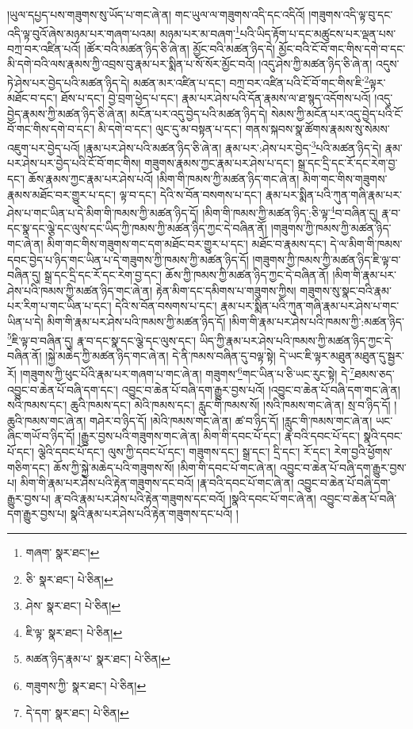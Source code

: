 །ཡུལ་དཔྱད་པས་གཟུགས་སུ་ཡོད་པ་གང་ཞེ་ན། གང་ཡུལ་ལ་གཟུགས་འདི་དང་འདིའོ། །གཟུགས་འདི་ལྟ་བུ་དང་འདི་ལྟ་བུའོ་ཞེས་མཉམ་པར་གཞག་པའམ། མཉམ་པར་མ་བཞག་\footnote{གཞག་  སྣར་ཐང་། }པའི་ཡིད་རྟོག་པ་དང་མཚུངས་པར་ལྡན་པས་བཀྲ་བར་འཛིན་པའོ། །ཚོར་བའི་མཚན་ཉིད་ཅི་ཞེ་ན། མྱོང་བའི་མཚན་ཉིད་དེ། མྱོང་བའི་ངོ་བོ་གང་གིས་དགེ་བ་དང་མི་དགེ་བའི་ལས་རྣམས་ཀྱི་འབྲས་བུ་རྣམ་པར་སྨིན་པ་སོ་སོར་མྱོང་བའོ། །འདུ་ཤེས་ཀྱི་མཚན་ཉིད་ཅི་ཞེ་ན། འདུས་ཏེ་ཤེས་པར་བྱེད་པའི་མཚན་ཉིད་དེ། མཚན་མར་འཛིན་པ་དང་། བཀྲ་བར་འཛིན་པའི་ངོ་བོ་གང་གིས་ཇི་\footnote{ཅི་  སྣར་ཐང་།  པེ་ཅིན། }ལྟར་མཐོང་བ་དང་། ཐོས་པ་དང་། བྱེ་བྲག་ཕྱེད་པ་དང་། རྣམ་པར་ཤེས་པའི་དོན་རྣམས་ལ་ཐ་སྙད་འདོགས་པའོ། །འདུ་བྱེད་རྣམས་ཀྱི་མཚན་ཉིད་ཅི་ཞེ་ན། མངོན་པར་འདུ་བྱེད་པའི་མཚན་ཉིད་དེ། སེམས་ཀྱི་མངོན་པར་འདུ་བྱེད་པའི་ངོ་བོ་གང་གིས་དགེ་བ་དང་། མི་དགེ་བ་དང་། ལུང་དུ་མ་བསྟན་པ་དང་། གནས་སྐབས་སྣ་ཚོགས་རྣམས་སུ་སེམས་འཇུག་པར་བྱེད་པའོ། །རྣམ་པར་ཤེས་པའི་མཚན་ཉིད་ཅི་ཞེ་ན། རྣམ་པར་:ཤེས་པར་བྱེད་\footnote{ཤེས་  སྣར་ཐང་།  པེ་ཅིན། }པའི་མཚན་ཉིད་དེ། རྣམ་པར་ཤེས་པར་བྱེད་པའི་ངོ་བོ་གང་གིས། གཟུགས་རྣམས་ཀྱང་རྣམ་པར་ཤེས་པ་དང་། སྒྲ་དང་དྲི་དང་རོ་དང་རེག་བྱ་དང་། ཆོས་རྣམས་ཀྱང་རྣམ་པར་ཤེས་པའོ། །མིག་གི་ཁམས་ཀྱི་མཚན་ཉིད་གང་ཞེ་ན། མིག་གང་གིས་གཟུགས་རྣམས་མཐོང་བར་གྱུར་པ་དང་། ལྟ་བ་དང་། དེའི་ས་བོན་བསགས་པ་དང་། རྣམ་པར་སྨིན་པའི་ཀུན་གཞི་རྣམ་པར་ཤེས་པ་གང་ཡིན་པ་དེ་མིག་གི་ཁམས་ཀྱི་མཚན་ཉིད་དོ། །མིག་གི་ཁམས་ཀྱི་མཚན་ཉིད་:ཅི་ལྟ་\footnote{ཇི་ལྟ་  སྣར་ཐང་།  པེ་ཅིན། }བ་བཞིན་དུ། རྣ་བ་དང་སྣ་དང་ལྕེ་དང་ལུས་དང་ཡིད་ཀྱི་ཁམས་ཀྱི་མཚན་ཉིད་ཀྱང་དེ་བཞིན་ནོ། །གཟུགས་ཀྱི་ཁམས་ཀྱི་མཚན་ཉིད་གང་ཞེ་ན། མིག་གང་གིས་གཟུགས་གང་དག་མཐོང་བར་གྱུར་པ་དང་། མཐོང་བ་རྣམས་དང་། དེ་ལ་མིག་གི་ཁམས་དབང་བྱེད་པ་ཉིད་གང་ཡིན་པ་དེ་གཟུགས་ཀྱི་ཁམས་ཀྱི་མཚན་ཉིད་དོ། །གཟུགས་ཀྱི་ཁམས་ཀྱི་མཚན་ཉིད་ཇི་ལྟ་བ་བཞིན་དུ། སྒྲ་དང་དྲི་དང་རོ་དང་རེག་བྱ་དང་། ཆོས་ཀྱི་ཁམས་ཀྱི་མཚན་ཉིད་ཀྱང་དེ་བཞིན་ནོ། །མིག་གི་རྣམ་པར་ཤེས་པའི་ཁམས་ཀྱི་མཚན་ཉིད་གང་ཞེ་ན། རྟེན་མིག་དང་དམིགས་པ་གཟུགས་ཀྱིས། གཟུགས་སུ་སྣང་བའི་རྣམ་པར་རིག་པ་གང་ཡིན་པ་དང་། དེའི་ས་བོན་བསགས་པ་དང་། རྣམ་པར་སྨིན་པའི་ཀུན་གཞི་རྣམ་པར་ཤེས་པ་གང་ཡིན་པ་དེ། མིག་གི་རྣམ་པར་ཤེས་པའི་ཁམས་ཀྱི་མཚན་ཉིད་དོ། །མིག་གི་རྣམ་པར་ཤེས་པའི་ཁམས་ཀྱི་:མཚན་ཉིད་\footnote{མཚན་ཉིད་རྣམ་པ་  སྣར་ཐང་།  པེ་ཅིན། }ཇི་ལྟ་བ་བཞིན་དུ། རྣ་བ་དང་སྣ་དང་ལྕེ་དང་ལུས་དང་། ཡིད་ཀྱི་རྣམ་པར་ཤེས་པའི་ཁམས་ཀྱི་མཚན་ཉིད་ཀྱང་དེ་བཞིན་ནོ། །སྐྱེ་མཆེད་ཀྱི་མཚན་ཉིད་གང་ཞེ་ན། དེ་ནི་ཁམས་བཞིན་དུ་བལྟ་སྟེ། དེ་ཡང་ཇི་ལྟར་མཐུན་མཐུན་དུ་སྦྱར་རོ། །གཟུགས་ཀྱི་ཕུང་པོའི་རྣམ་པར་གཞག་པ་གང་ཞེ་ན། གཟུགས་\footnote{གཟུགས་ཀྱི་  སྣར་ཐང་།  པེ་ཅིན། }གང་ཡིན་པ་ཅི་ཡང་རུང་སྟེ། དེ་\footnote{དེ་དག་  སྣར་ཐང་།  པེ་ཅིན། }ཐམས་ཅད་འབྱུང་བ་ཆེན་པོ་བཞི་དག་དང་། འབྱུང་བ་ཆེན་པོ་བཞི་དག་རྒྱུར་བྱས་པའོ། །འབྱུང་བ་ཆེན་པོ་བཞི་དག་གང་ཞེ་ན། སའི་ཁམས་དང་། ཆུའི་ཁམས་དང་། མེའི་ཁམས་དང་། རླུང་གི་ཁམས་སོ། །སའི་ཁམས་གང་ཞེ་ན། སྲ་བ་ཉིད་དོ། །ཆུའི་ཁམས་གང་ཞེ་ན། གཤེར་བ་ཉིད་དོ། །མེའི་ཁམས་གང་ཞེ་ན། ཚ་བ་ཉིད་དོ། །རླུང་གི་ཁམས་གང་ཞེ་ན། ཡང་ཞིང་གཡོ་བ་ཉིད་དོ། །རྒྱུར་བྱས་པའི་གཟུགས་གང་ཞེ་ན། མིག་གི་དབང་པོ་དང་། རྣ་བའི་དབང་པོ་དང་། སྣའི་དབང་པོ་དང་། ལྕེའི་དབང་པོ་དང་། ལུས་ཀྱི་དབང་པོ་དང་། གཟུགས་དང་། སྒྲ་དང་། དྲི་དང་། རོ་དང་། རེག་བྱའི་ཕྱོགས་གཅིག་དང་། ཆོས་ཀྱི་སྐྱེ་མཆེད་པའི་གཟུགས་སོ། །མིག་གི་དབང་པོ་གང་ཞེ་ན། འབྱུང་བ་ཆེན་པོ་བཞི་དག་རྒྱུར་བྱས་པ། མིག་གི་རྣམ་པར་ཤེས་པའི་རྟེན་གཟུགས་དང་བའོ། །རྣ་བའི་དབང་པོ་གང་ཞེ་ན། འབྱུང་བ་ཆེན་པོ་བཞི་དག་རྒྱུར་བྱས་པ། རྣ་བའི་རྣམ་པར་ཤེས་པའི་རྟེན་གཟུགས་དང་བའོ། །སྣའི་དབང་པོ་གང་ཞེ་ན། འབྱུང་བ་ཆེན་པོ་བཞི་དག་རྒྱུར་བྱས་པ། སྣའི་རྣམ་པར་ཤེས་པའི་རྟེན་གཟུགས་དང་པའོ། །
